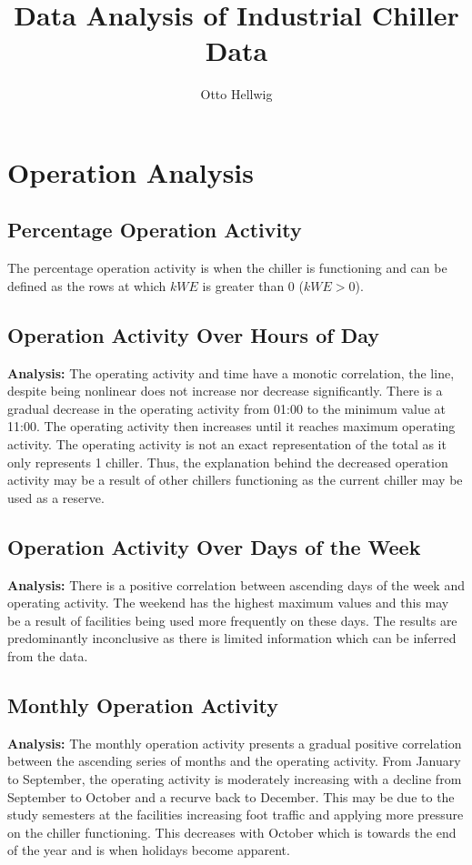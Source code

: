 \documentclass{article}
\title{Data Analysis of Industrial Chiller Data}
\author{Otto Hellwig}
\date{} %
\begin{document}
\maketitle

\section{Operation Analysis}

\subsection{Percentage Operation Activity}
The percentage operation activity is when the chiller is functioning and can be defined as the rows at which $kWE$ is greater than 0 ($kWE>0$).

\subsection{Operation Activity Over Hours of Day}
\textbf{Analysis:} The operating activity and time have a monotic correlation, the line, despite being nonlinear does not increase nor decrease significantly. There is a gradual decrease in the operating activity from 01:00 to the minimum value at 11:00. The operating activity then increases until it reaches maximum operating activity. The operating activity is not an exact representation of the total as it only represents 1 chiller. Thus, the explanation behind the decreased operation activity may be a result of other chillers functioning as the current chiller may be used as a reserve.

\subsection{Operation Activity Over Days of the Week}
\textbf{Analysis:} There is a positive correlation between ascending days of the week and operating activity. The weekend has the highest maximum values and this may be a result of facilities being used more frequently on these days. The results are predominantly inconclusive as there is limited information which can be inferred from the data.

\subsection{Monthly Operation Activity}
\textbf{Analysis:} The monthly operation activity presents a gradual positive correlation between the ascending series of months and the operating activity. From January to September, the operating activity is moderately increasing with a decline from September to October and a recurve back to December. This may be due to the study semesters at the facilities increasing foot traffic and applying more pressure on the chiller functioning. This decreases with October which is towards the end of the year and is when holidays become apparent.
\end{document}
